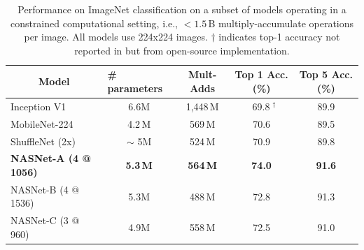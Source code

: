 \begin{table}[h!]
\centering
\small
\begin{tabular}{l|cc|cc}
\toprule
\multicolumn{1}{c|}{\bf Model} & \multicolumn{1}{l}{\bf \# parameters} & \bf Mult-Adds & \bf Top 1 Acc. (\%) & \bf Top 5 Acc. (\%)  \\ \midrule
Inception V1~\cite{szegedy2015going} & 6.6M & 1,448\,M & $\;\;$69.8$\;^{\dagger}$ & 89.9 \\
MobileNet-224 \cite{howard2017mobilenets} & 4.2\,M & 569\,M & 70.6 & 89.5  \\
ShuffleNet (2x) \cite{shufflenet} & $\sim$ 5M & 524\,M & 70.9 & 89.8 \\
\midrule
\textbf{NASNet-A (4 @ 1056)} & \textbf{5.3\,M} & \textbf{564\,M} & \textbf{74.0} & \textbf{91.6} \\
NASNet-B (4 @ 1536) & 5.3M & 488\,M & 72.8 & 91.3  \\
NASNet-C (3 @ 960) & 4.9M & 558\,M & 72.5 & 91.0  \\
\bottomrule
\end{tabular}

\vspace{0.2cm}
\caption{Performance on ImageNet classification on a subset of models operating in a constrained computational setting, i.e., $< 1.5$\,B multiply-accumulate operations per image. All models use 224x224 images.
$\dagger$ indicates top-1 accuracy not reported in \cite{szegedy2015going} but from open-source implementation.}
\label{tab:imagenet-constrained}
\end{table}




